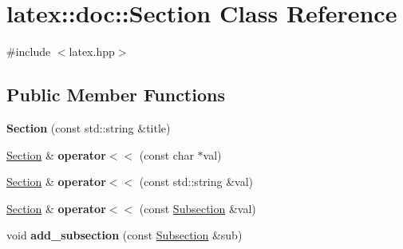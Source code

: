 \hypertarget{classlatex_1_1doc_1_1Section}{\section{latex\-:\-:doc\-:\-:\-Section \-Class \-Reference}
\label{classlatex_1_1doc_1_1Section}
}


{\ttfamily \#include $<$latex.\-hpp$>$}

\subsection*{\-Public \-Member \-Functions}
\begin{DoxyCompactItemize}
\item 
\hypertarget{classlatex_1_1doc_1_1Section_a675efb7af929560c3a6a07536c50d133}{{\bfseries \-Section} (const std\-::string \&title)}\label{classlatex_1_1doc_1_1Section_a675efb7af929560c3a6a07536c50d133}

\item 
\hypertarget{classlatex_1_1doc_1_1Section_a53e777158eda75ac8f5cac6362d9f174}{\hyperlink{classlatex_1_1doc_1_1Section}{\-Section} \& {\bfseries operator$<$$<$} (const char $\ast$val)}\label{classlatex_1_1doc_1_1Section_a53e777158eda75ac8f5cac6362d9f174}

\item 
\hypertarget{classlatex_1_1doc_1_1Section_a92952468be4cbb0d120130e3758d4477}{\hyperlink{classlatex_1_1doc_1_1Section}{\-Section} \& {\bfseries operator$<$$<$} (const std\-::string \&val)}\label{classlatex_1_1doc_1_1Section_a92952468be4cbb0d120130e3758d4477}

\item 
\hypertarget{classlatex_1_1doc_1_1Section_aae377afedd501650c33197a086f7e4b0}{\hyperlink{classlatex_1_1doc_1_1Section}{\-Section} \& {\bfseries operator$<$$<$} (const \hyperlink{classlatex_1_1doc_1_1Subsection}{\-Subsection} \&val)}\label{classlatex_1_1doc_1_1Section_aae377afedd501650c33197a086f7e4b0}

\item 
\hypertarget{classlatex_1_1doc_1_1Section_ab6ac21c9c03fec82ad67758d2eef050a}{void {\bfseries add\-\_\-subsection} (const \hyperlink{classlatex_1_1doc_1_1Subsection}{\-Subsection} \&sub)}\label{classlatex_1_1doc_1_1Section_ab6ac21c9c03fec82ad67758d2eef050a}

\end{DoxyCompactItemize}
